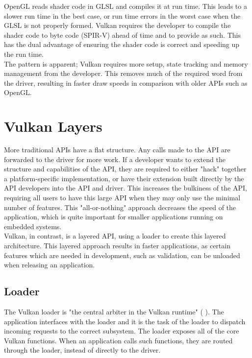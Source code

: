 \documentclass[12pt]{report}
\newcommand{\citebu}[1]{(\citenoparen{#1})}
\newcommand{\citenoparen}[1]{\citeauthor{#1} \citeyear{#1}}
\theoremstyle{definition}
\begin{document}
      OpenGL reads shader code in GLSL and compiles it at run time. This leads
      to a slower run time in the best case, or run time errors in the worst
      case when the GLSL is not properly formed. Vulkan requires the developer
      to compile the shader code to byte code (SPIR-V) ahead of time and to
      provide as such. This has the dual advantage of ensuring the shader
      code is correct and speeding up the run time. \\

      The pattern is apparent; Vulkan requires more setup, state tracking and
      memory management from the developer. This removes much of the required
      word from the driver, resulting in faster draw speeds in comparison
      with older APIs such as OpenGL.

    \section{Vulkan Layers}

      More traditional APIs have a flat structure. Any calls made to the API are
      forwarded to the driver for more work. If a developer wants to extend the
      structure and capabilities of the API, they are required to either "hack"
      together a platform-specific implementation, or have their extension
      built directly by the API developers into the API and driver. This
      increases the bulkiness of the API, requiring all users to have
      this large API when they may only use the minimal number of features.
      This "all-or-nothing" approach decreases the speed of the application,
      which is quite important for smaller applications running on embedded
      systems. \\

      Vulkan, in contrast, is a layered API, using a loader to create this
      layered architecture. This layered approach results in faster
      applications, as certain features which are needed in development,
      such as validation, can be unloaded when releasing an application.

      \subsection{Loader}

      The Vulkan loader is "the central arbiter in the Vulkan runtime" \citebu{renderdoc}.
      The application interfaces with the loader and it is the task of the
      loader to dispatch incoming requests to the correct subsystem. The
      loader exposes all of the core Vulkan functions. When an application
      calls such functions, they are routed through the loader, instead of
      directly to the driver. \\
\end{document}
